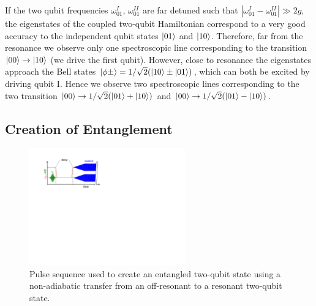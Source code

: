 If the two qubit frequencies $\omega_{01}^I$, $\omega_{01}^{II}$ are far detuned such that $|\omega_{01}^I-\omega_{01}^{II}|\gg 2g$, the eigenstates of the coupled two-qubit Hamiltonian correspond to a very good accuracy to the independent qubit states $\left| 01 \right>$ and $\left| 10 \right>$. Therefore, far from the resonance we observe only one spectroscopic line corresponding to the transition $\left| 00 \right>\to\left| 10 \right>$ (we drive the first qubit). However, close to resonance the eigenstates approach the Bell states $\left| \phi\pm \right> = 1/\sqrt{2}(\left| 10 \right>\pm\left| 01 \right>)$, which can both be excited by driving qubit I. Hence we observe two spectroscopic lines corresponding to the two transition $\left| 00 \right>\to 1/\sqrt{2}(\left| 01 \right>+\left| 10 \right>)$ and $\left| 00 \right>\to 1/\sqrt{2}(\left| 01 \right>-\left| 10 \right>)$.

\subsection{Creation of Entanglement} \label{section:creation_of_entanglement}

\begin{figure}
	\centering
	\includegraphics[width=0.6\textwidth]{"./material/figures/measurement/qubit_swap"}
	\caption[Pulse sequence used to create an entangled two-qubit state]{Pulse sequence used to create an entangled two-qubit state using a non-adiabatic transfer from an off-resonant to a resonant two-qubit state.}
	\label{fig:qubit_swap_pulse_sequence}
\end{figure}

